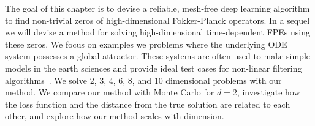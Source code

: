 The goal of this chapter is to devise a reliable, mesh-free deep learning algorithm to find non-trivial zeros of high-dimensional Fokker-Planck operators. In a sequel we will devise a method for solving high-dimensional time-dependent FPEs using these zeros. We focus on examples we problems where the underlying ODE system possesses a global attractor.  These systems are often used to make simple models in the earth sciences and provide ideal test cases for non-linear filtering algorithms~\cite{carrassi2022data}. We solve 2, 3, 4, 6, 8, and 10 dimensional problems with our method. We compare our method with Monte Carlo for $d=2$, investigate how the loss function and the distance from the true solution are related to each other, and explore how our method scales with dimension.

